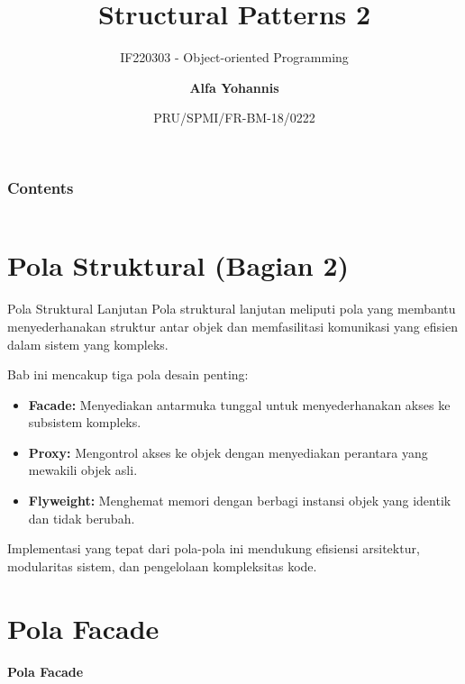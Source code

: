 \documentclass[aspectratio=169, table]{beamer}
\subtitle{IF220303 - Object-oriented Programming}
\title{\Huge{Structural Patterns 2}\\\vspace{30pt}}
\date[Serial]{\scriptsize {PRU/SPMI/FR-BM-18/0222}}
\author[Pradita]{\small {\textbf{Alfa Yohannis}}}
\begin{document}
\frame{\titlepage}

\begin{frame}[fragile]
\frametitle{Contents}
\vspace{20pt}
\begin{columns}[t]
\tableofcontents[sections={1-2}]

\tableofcontents[sections={3-4}]
\end{columns}
\end{frame}


\section{Pola Struktural (Bagian 2)}

\begin{frame}{Pola Struktural Lanjutan}
	\vspace{10pt}
	Pola struktural lanjutan meliputi pola yang membantu menyederhanakan struktur antar objek dan memfasilitasi komunikasi yang efisien dalam sistem yang kompleks. 
	
	\vspace{10pt}
	Bab ini mencakup tiga pola desain penting:
	\begin{itemize}
		\item \textbf{Facade:} Menyediakan antarmuka tunggal untuk menyederhanakan akses ke subsistem kompleks.
		\item \textbf{Proxy:} Mengontrol akses ke objek dengan menyediakan perantara yang mewakili objek asli.
		\item \textbf{Flyweight:} Menghemat memori dengan berbagi instansi objek yang identik dan tidak berubah.
	\end{itemize}
	
	\vspace{5pt}
	Implementasi yang tepat dari pola-pola ini mendukung efisiensi arsitektur, modularitas sistem, dan pengelolaan kompleksitas kode.
\end{frame}


\section{Pola Facade}

\begin{frame}{\hfill}
	\centering
	\textbf{\Huge{Pola Facade}}
\end{frame}
\end{document}
